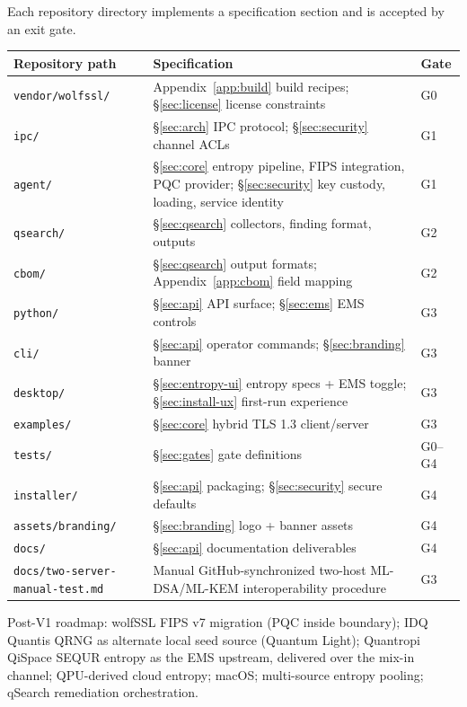 \documentclass[10pt]{article}
\newcommand{\code}[1]{\texttt{\small #1}}
\begin{document}
Each repository directory implements a specification section and is accepted by an
exit gate.

\begin{small}
\begin{tabularx}{\textwidth}{@{}lLl@{}}
\toprule
\textbf{Repository path} & \textbf{Specification} & \textbf{Gate} \\
\midrule
\code{vendor/wolfssl/} & Appendix~\ref{app:build} build recipes;
  \S\ref{sec:license} license constraints & G0 \\
\code{ipc/} & \S\ref{sec:arch} IPC protocol; \S\ref{sec:security} channel ACLs & G1 \\
\code{agent/} & \S\ref{sec:core} entropy pipeline, FIPS integration, PQC provider;
  \S\ref{sec:security} key custody, loading, service identity & G1 \\
\code{qsearch/} & \S\ref{sec:qsearch} collectors, finding format, outputs & G2 \\
\code{cbom/} & \S\ref{sec:qsearch} output formats; Appendix~\ref{app:cbom} field
  mapping & G2 \\
\code{python/} & \S\ref{sec:api} API surface; \S\ref{sec:ems} EMS controls & G3 \\
\code{cli/} & \S\ref{sec:api} operator commands; \S\ref{sec:branding} banner & G3 \\
\code{desktop/} & \S\ref{sec:entropy-ui} entropy specs + EMS toggle;
  \S\ref{sec:install-ux} first-run experience & G3 \\
\code{examples/} & \S\ref{sec:core} hybrid TLS 1.3 client/server & G3 \\
\code{tests/} & \S\ref{sec:gates} gate definitions & G0--G4 \\
\code{installer/} & \S\ref{sec:api} packaging; \S\ref{sec:security} secure defaults & G4 \\
\code{assets/branding/} & \S\ref{sec:branding} logo + banner assets & G4 \\
\code{docs/} & \S\ref{sec:api} documentation deliverables & G4 \\
\code{docs/two-server-manual-test.md} & Manual GitHub-synchronized two-host
  ML-DSA/ML-KEM interoperability procedure & G3 \\
\bottomrule
\end{tabularx}
\end{small}

Post-V1 roadmap: wolfSSL FIPS v7 migration (PQC inside boundary); IDQ Quantis QRNG as
alternate local seed source (Quantum Light); Quantropi QiSpace SEQUR entropy as the
EMS upstream, delivered over the mix-in channel; QPU-derived cloud entropy;
macOS; multi-source entropy pooling; qSearch remediation orchestration.
\end{document}
